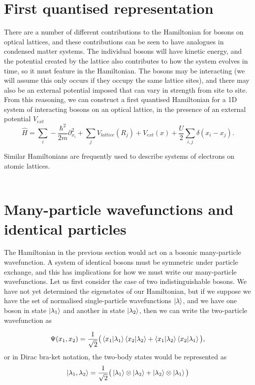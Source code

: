 \documentclass[a4paper,10pt]{article}
\begin{document}
\section{First quantised representation}
There are a number of different contributions to the Hamiltonian for bosons on optical lattices, and these contributions can be seen to have analogues in condensed matter systems.
The individual bosons will have kinetic energy, and the potential created by the lattice also contributes to how the system evolves in time, so it must feature in the Hamiltonian.
The bosons may be interacting (we will assume this only occurs if they occupy the same lattice sites), and there may also be an external potential  imposed that can vary in strength
from site to site. From this reasoning, we can construct a first quantised Hamiltonian for a 1D system of interacting bosons on an optical lattice, in the presence of an external potential $V_{ext}$
\begin{equation}
 \hat{H}=\sum_{i}-\frac{\hbar^{2}}{2m}  \partial_{x_{i}}^2+\sum_{j}V_{lattice}(R_{j})+V_{ext}(x)+\frac{U}{2}\sum_{i,j}\delta(x_{i}-x_{j}).
\end{equation}

Similar Hamiltonians are frequently used to describe systems of electrons on atomic lattices.
\\\\


\section{Many-particle wavefunctions and identical particles \cite{Negele1988, Inkson1984, Altland2010}}
The Hamiltonian in the previous section would act on a bosonic many-particle wavefunction. A system of identical bosons must be symmetric under particle exchange, and this has 
implications for how we must write our many-particle wavefunctions. Let us first consider the case of two indistinguishable bosons. We have not yet determined the eigenstates 
of our Hamiltonian, but if we suppose we have the set of normalised single-particle wavefunctions $\ket{\lambda}$, and we have one boson in state $\ket{\lambda_1}$ and another
in state $\ket{\lambda_2}$, then we can write the two-particle wavefunction as

\begin{equation}
 \Psi(x_1,x_2)=\frac{1}{\sqrt{2}}\big(\braket{x_1|\lambda_1}\braket{x_2|\lambda_2}+\braket{x_1|\lambda_2}\braket{x_2|\lambda_1}\big),
\end{equation}
or in Dirac bra-ket notation, the two-body states would be represented as
\begin{equation}
 \ket{\lambda_1,\lambda_2}=\frac{1}{\sqrt{2}}\big(\ket{\lambda_1}\otimes \ket{\lambda_2}+\ket{\lambda_2}\otimes\ket{\lambda_1}\big)
\end{equation}
\end{document}
